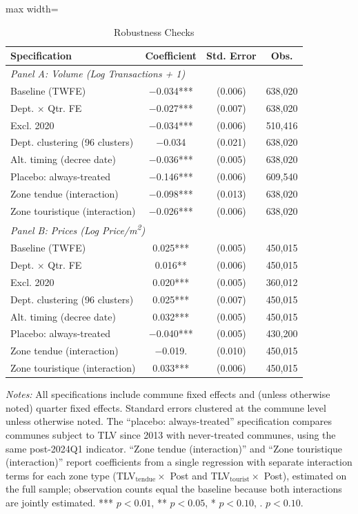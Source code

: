 \documentclass[12pt]{article}
\begin{document}
\begin{table}[H]
\centering
\caption{Robustness Checks}
\label{tab:robustness}
\begin{adjustbox}{max width=\textwidth}
\begin{tabular}{lccc}
\toprule
Specification & Coefficient & Std. Error & Obs. \\
\midrule
\multicolumn{4}{l}{\textit{Panel A: Volume (Log Transactions + 1)}} \\
\quad Baseline (TWFE) & $-$0.034*** & (0.006) & 638,020 \\
\quad Dept. $\times$ Qtr. FE & $-$0.027*** & (0.007) & 638,020 \\
\quad Excl. 2020 & $-$0.034*** & (0.006) & 510,416 \\
\quad Dept. clustering (96 clusters) & $-$0.034 & (0.021) & 638,020 \\
\quad Alt. timing (decree date) & $-$0.036*** & (0.005) & 638,020 \\
\quad Placebo: always-treated & $-$0.146*** & (0.006) & 609,540 \\
\quad Zone tendue (interaction) & $-$0.098*** & (0.013) & 638,020 \\
\quad Zone touristique (interaction) & $-$0.026*** & (0.006) & 638,020 \\
\midrule
\multicolumn{4}{l}{\textit{Panel B: Prices (Log Price/m\textsuperscript{2})}} \\
\quad Baseline (TWFE) & 0.025*** & (0.005) & 450,015 \\
\quad Dept. $\times$ Qtr. FE & 0.016** & (0.006) & 450,015 \\
\quad Excl. 2020 & 0.020*** & (0.005) & 360,012 \\
\quad Dept. clustering (96 clusters) & 0.025*** & (0.007) & 450,015 \\
\quad Alt. timing (decree date) & 0.032*** & (0.005) & 450,015 \\
\quad Placebo: always-treated & $-$0.040*** & (0.005) & 430,200 \\
\quad Zone tendue (interaction) & $-$0.019. & (0.010) & 450,015 \\
\quad Zone touristique (interaction) & 0.033*** & (0.006) & 450,015 \\
\bottomrule
\end{tabular}
\end{adjustbox}
\begin{minipage}{0.95\textwidth}
\vspace{0.3em}
\footnotesize
\textit{Notes:} All specifications include commune fixed effects and (unless otherwise noted) quarter fixed effects. Standard errors clustered at the commune level unless otherwise noted. The ``placebo: always-treated'' specification compares communes subject to TLV since 2013 with never-treated communes, using the same post-2024Q1 indicator. ``Zone tendue (interaction)'' and ``Zone touristique (interaction)'' report coefficients from a single regression with separate interaction terms for each zone type (TLV$_{\text{tendue}} \times$ Post and TLV$_{\text{tourist}} \times$ Post), estimated on the full sample; observation counts equal the baseline because both interactions are jointly estimated. *** $p<0.01$, ** $p<0.05$, * $p<0.10$, . $p<0.10$.

\end{minipage}
\end{table}
\end{document}
